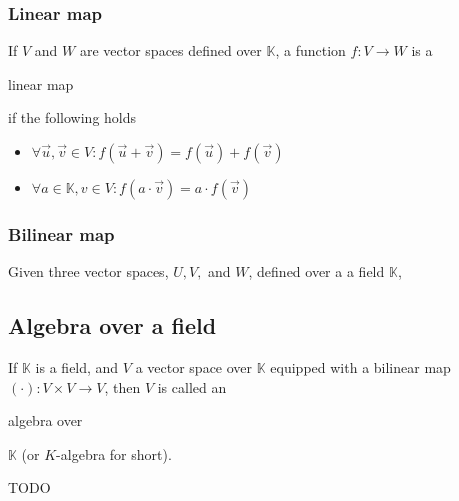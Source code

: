 \documentclass{article}
\newenvironment{itemized}{ 
\begin{itemize}
\setlength{\itemsep}{0pt}
\setlength{\parskip}{0pt}
\setlength{\parsep}{0pt}     
}{\end{itemize}}
\begin{document}
\subsubsection*{Linear map}

If $V$ and $W$ are vector spaces defined over $\mathbb{K}$, a function $f : V \rightarrow W$ is a \begin{em}linear map\end{em} if the following holds

  \begin{itemized}
    \item $ \forall \vec{u}, \vec{v} \in V : f(\vec{u} + \vec{v}) = f(\vec{u}) + f(\vec{v}) $
    \item $ \forall a \in \mathbb{K}, v \in V : f(a \cdot \vec{v}) = a \cdot f(\vec{v}) $
  \end{itemized}

\subsubsection*{Bilinear map}

Given three vector spaces, $U, V, $ and $W$, defined over a a field $\mathbb{K}$,

\subsection*{Algebra over a field}

If $\mathbb{K}$ is a field, and $V$ a vector space over $\mathbb{K}$ equipped with a bilinear map $(\cdot) : V \times V \rightarrow V$, then $V$ is called an \begin{em}algebra over\end{em} $\mathbb{K}$ (or $K$-algebra for short).

  TODO
\end{document}
